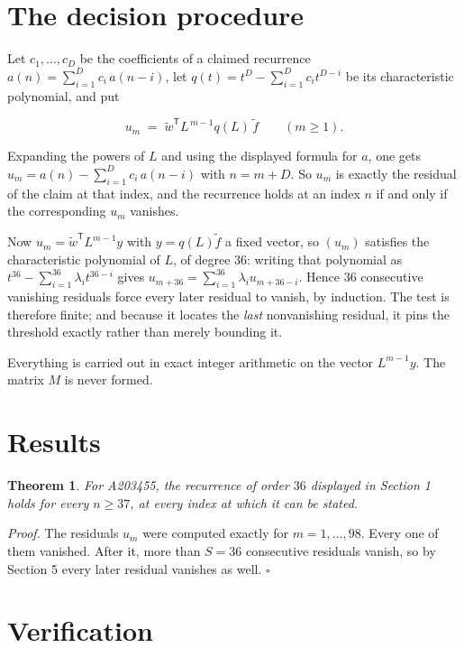 \documentclass[11pt]{article}
\newtheorem{theorem}{Theorem}
\theoremstyle{definition}
\begin{document}
\section{The decision procedure}

Let $c_1,\dots,c_D$ be the coefficients of a claimed recurrence $a(n) = \sum_{i=1}^{D} c_i\,a(n-i)$, let $q(t) = t^{D} - \sum_{i=1}^{D} c_i t^{D-i}$ be its characteristic polynomial, and put

\[u_m \;=\; \tilde w^{\mathsf T} L^{\,m-1} q(L)\,\tilde f \qquad (m \ge 1).\]

Expanding the powers of $L$ and using the displayed formula for $a$, one gets $u_m = a(n) - \sum_{i=1}^{D} c_i\,a(n-i)$ with $n = m + D$. So $u_m$ is exactly the residual of the claim at that index, and the recurrence holds at an index $n$ if and only if the corresponding $u_m$ vanishes.

Now $u_m = \tilde w^{\mathsf T} L^{m-1} y$ with $y = q(L)\tilde f$ a fixed vector, so $(u_m)$ satisfies the characteristic polynomial of $L$, of degree $36$: writing that polynomial as $t^{36} - \sum_{i=1}^{36} \lambda_i t^{36-i}$ gives $u_{m+36} = \sum_{i=1}^{36} \lambda_i u_{m+36-i}$. Hence $36$ consecutive vanishing residuals force every later residual to vanish, by induction. The test is therefore finite; and because it locates the {\itshape last} nonvanishing residual, it pins the threshold exactly rather than merely bounding it.

Everything is carried out in exact integer arithmetic on the vector $L^{m-1}y$. The matrix $M$ is never formed.

\section{Results}

\begin{theorem} For A203455, the recurrence of order $36$ displayed in Section 1 holds for every $n \ge 37$, at every index at which it can be stated.\end{theorem}

{\itshape Proof.} The residuals $u_m$ were computed exactly for $m = 1,\dots,98$. Every one of them vanished. After it, more than $S = 36$ consecutive residuals vanish, so by Section 5 every later residual vanishes as well. $\square$

\section{Verification}
\end{document}
